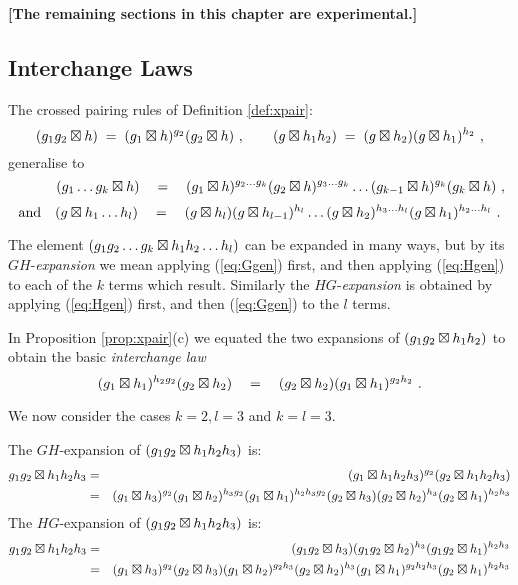 \noindent
{\bf [The remaining sections in this chapter are experimental.]}

\bigskip

\subsection{Interchange Laws} \label{subs:intlaw}

The crossed pairing rules of Definition \ref{def:xpair}:
$$
(g_1g_2 \boxtimes h) \;=\; 
(g_1 \boxtimes h)^{g_2} (g_2 \boxtimes h)~,
\qquad
(g \boxtimes h_1h_2) \;=\;
(g \boxtimes h_2)   (g \boxtimes h_1)^{h_2}~,
$$
generalise to
\begin{equation}\label{eq:Ggen}
\qquad\quad
(g_1 \ldots g_{k}\boxtimes h) \quad=\quad 
 (g_1 \boxtimes h)^{g_2 \ldots g_{k}}   
  (g_2 \boxtimes h)^{g_{3} \ldots g_{k}} \ldots 
   (g_{k-1}\boxtimes h)^{g_{k}}   (g_{k}\boxtimes h)~,
\end{equation}
\begin{equation}\label{eq:Hgen}
\mbox{and}\quad
(g \boxtimes h_1 \ldots h_{l}) \quad=\quad (g \boxtimes h_{l})  
 (g \boxtimes h_{l-1})^{h_{l}} \ldots (g \boxtimes h_2)^{h_{3} \ldots h_{l}}
  (g \boxtimes h_1)^{h_2 \ldots h_{l}}~.
\end{equation}

\medskip
The element  $(g_1 g_2 \ldots g_k \boxtimes h_1 h_2 \ldots h_{l})$
can be expanded in many ways, but by its $GH$-\emph{expansion}
we mean applying (\ref{eq:Ggen}) first,
and then applying (\ref{eq:Hgen}) to each of the  $k$  terms which result.
Similarly the $HG$-\emph{expansion} is obtained by
applying (\ref{eq:Hgen}) first, and then (\ref{eq:Ggen}) to the $l$ terms.

In Proposition \ref{prop:xpair}(c) we equated the two expansions of  
$(g_1g_2 \boxtimes h_1h_2)$  
to obtain the basic \emph{interchange law}
\begin{equation}
(g_1 \boxtimes h_1)^{h_2g_2}(g_2 \boxtimes h_2)
\quad=\quad 
(g_2 \boxtimes h_2)(g_1 \boxtimes h_1)^{g_2h_2}~.
\end{equation}

We now consider the cases  $k=2, l=3$  and  $k=l=3$.

\vspace{2mm}\noindent
The $GH$-expansion of $(g_1g_2 \boxtimes h_1h_2h_{3})$ is:
\begin{eqnarray*}
         g_1g_2 \boxtimes h_1h_2h_{3} 
  & = &  (g_1 \boxtimes h_1h_2h_{3})^{g_2}   
          (g_2 \boxtimes h_1h_2h_{3}) \\
  & = &  (g_1 \boxtimes h_{3})^{g_2}   (g_1 \boxtimes h_2)^{h_{3}g_2} 
          (g_1 \boxtimes h_1)^{h_2h_{3}g_2} (g_2 \boxtimes h_{3}) (g_2 \boxtimes h_2)^{h_{3}} 
           (g_2 \boxtimes h_1)^{h_2h_{3}}
\end{eqnarray*}
The $HG$-expansion of  $(g_1g_2 \boxtimes h_1h_2h_{3})$ is:
\begin{eqnarray*}
g_1g_2 \boxtimes h_1h_2h_{3}  
  & = &  (g_1g_2 \boxtimes h_{3})   (g_1g_2 \boxtimes h_2)^{h_{3}} 
          (g_1g_2 \boxtimes h_1)^{h_2h_{3}} \\  
  & = &  (g_1 \boxtimes h_{3})^{g_2} (g_2 \boxtimes h_{3}) (g_1 \boxtimes h_2)^{g_2h_{3}}
           (g_2 \boxtimes h_2)^{h_{3}} (g_1 \boxtimes h_1)^{g_2h_2h_{3}} 
             (g_2 \boxtimes h_1)^{h_2h_{3}}
\end{eqnarray*}

